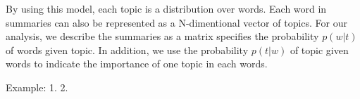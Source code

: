 By using this model, each topic is a distribution over words. Each word in summaries 
can also be represented as a N-dimentional vector of topics. For our analysis, 
we describe the summaries as a matrix specifies the probability $p(w|t)$ of words given topic. 
In addition, we use the probability $p(t|w)$ of topic given words to indicate the importance of 
one topic in each words.

Example:
1.
2.
